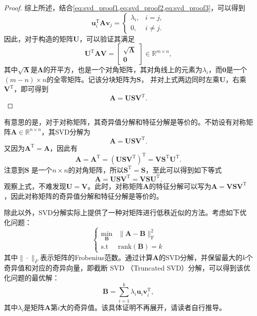 \begin{proof}
    综上所述，结合\cref{eq:svd_proof1,eq:svd_proof2,eq:svd_proof3}，可以得到
    \[
        \bm{u}_i^{\mathrm{T}} \mathbf{A} \bm{v}_j =
        \begin{cases}
            \lambda_i, & i = j,    \\
            0,         & i \neq j.
        \end{cases}
    \]
    因此，对于构造的矩阵\( \mathbf{U} \)，可以验证其满足
    \[
        \mathbf{U}^{\mathrm{T}} \mathbf{A} \mathbf{V} =
        \begin{bmatrix}
            \sqrt{\mathbf{\Lambda}} \\
            \mathbf{0}
        \end{bmatrix} \in \mathbb{R}^{m \times n},
    \]
    其中\( \sqrt{\mathbf{\Lambda}} \)是\( \mathbf{\Lambda} \)的开平方，也是一个对角矩阵，其对角线上的元素为\( \lambda_i \)，而\( \mathbf{0} \)是一个\( (m - n) \times n \)的全零矩阵。记该分块矩阵为\( \mathbf{S} \)， 并对上式两边同时左乘\( \mathbf{U} \)，右乘\( \mathbf{V}^{\mathrm{T}} \)，即可得到
    \[
        \mathbf{A} = \mathbf{U} \mathbf{S} \mathbf{V}^{\mathrm{T}}.
    \]
\end{proof}

有意思的是，对于对称矩阵，其奇异值分解和特征分解是等价的。不妨设有对称矩阵\( \mathbf{A} \in \mathbb{R}^{n \times n} \)，其SVD分解为
\[
    \mathbf{A} = \mathbf{U} \mathbf{S} \mathbf{V}^{\mathrm{T}}.
\]
又因为\( \mathbf{A}^{\mathrm{T}} = \mathbf{A} \)，因此有
\[
    \mathbf{A} = \mathbf{A}^{\mathrm{T}}= \left( \mathbf{U} \mathbf{S} \mathbf{V}^{\mathrm{T}} \right)^{\mathrm{T}} = \mathbf{V} \mathbf{S}^{\mathrm{T}} \mathbf{U}^{\mathrm{T}}.
\]
注意到\( \mathbf{S} \) 是一个\( n \times n \)的对角矩阵，所以\( \mathbf{S}^{\mathrm{T}}  = \mathbf{S} \)，至此可以得到如下等式
\[
    \mathbf{A} = \mathbf{U} \mathbf{S} \mathbf{V}^{\mathrm{T}} = \mathbf{V} \mathbf{S} \mathbf{U}^{\mathrm{T}}.
\]
观察上式，不难发现\( \mathbf{U} =  \mathbf{V} \)。此时，对称矩阵\( \mathbf{A} \)的特征分解可以写为\( \mathbf{A} = \mathbf{V} \mathbf{S} \mathbf{V}^{\mathrm{T}} \)，因此对称矩阵的奇异值分解和特征分解是等价的。

除此以外，SVD分解实际上提供了一种对矩阵进行低秩近似的方法。考虑如下优化问题：
\begin{equation}
    \begin{cases}
        \min_{\mathbf{B}} & \|\mathbf{A} - \mathbf{B}\|_{\mathrm{F}}^2 \\
        \text{s.t}        & \text{rank}(\mathbf{B}) = k
    \end{cases}
    \label{eq:sparse-approximation}
\end{equation}
其中\( \|\cdot\|_F \)表示矩阵的Frobenius范数。通过计算\( \mathbf{A} \)的SVD分解，并保留最大的\( k \)个奇异值和对应的奇异向量，即截断 SVD （Truncated SVD）分解，可以得到该优化问题的最优解：
\begin{equation}
    \mathbf{B} = \sum_{i=1}^{k} \lambda_i \bm{u}_i \bm{v}_i^{\mathrm{T}},
    \label{eq:sparse-approximation-solution}
\end{equation}
其中\( \lambda_i \)是矩阵\( \mathbf{A} \)第\( i \)大的奇异值。该具体证明不再展开，请读者自行推导。

